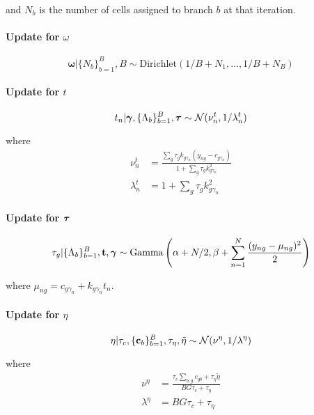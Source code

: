 and $N_b$ is the number of cells assigned to branch $b$ at that iteration.

\paragraph{Update for $\omega$}
\begin{equation}
  \bm \omega | \{N_b\}_{b=1}^B, B \sim \text{Dirichlet}(1/B + N_1, \ldots, 1/B + N_B)
\end{equation}

\paragraph{Update for $t$}
\begin{equation}
  t_n | {\bm \gamma}, \{ \Lambda_b \}_{b=1}^B, {\bm \tau} \sim \mathcal{N}(\nu^t_n, 1 / \lambda^t_n)
\end{equation}

where
\begin{equation}
\begin{aligned}
\nu^t_{n} & = \frac{\sum_g \tau_g k_{g\gamma_n} (y_{ng} - c_{g\gamma_n})}
{1 + \sum_g \tau_g k_{g\gamma_n}^2} \\
\lambda^t_{n} & = 1 + \sum_g \tau_g k_{g\gamma_n}^2
\end{aligned}
\end{equation}

\paragraph{Update for ${\bm \tau}$}
\begin{equation}
\tau_g |  \{ \Lambda_b \}_{b=1}^B, {\bf t}, {\bm \gamma} \sim \text{Gamma}\left( \alpha + N / 2,
\beta + \sum_{n=1}^N \frac{(y_{ng} - \mu_{ng})^2}{2}
\right)
\end{equation}

where $\mu_{ng} = c_{g\gamma_n} + k_{g\gamma_n} t_n$.

\paragraph{Update for $\eta$}
\begin{equation}
  \eta | \tau_c, \{{\bf c}_b\}_{b=1}^B, \tau_\eta, \tilde{\eta}
  \sim \mathcal{N}(\nu^\eta, 1 / \lambda^\eta)
\end{equation}

where
\begin{equation}
  \begin{aligned}
    \nu^\eta & = \frac{\tau_c \sum_{b,g} c_{gb}  + \tau_\eta \tilde{\eta}}
    {BG\tau_c + \tau_\eta} \\
    \lambda^\eta & = BG\tau_c + \tau_\eta
  \end{aligned}
\end{equation}

